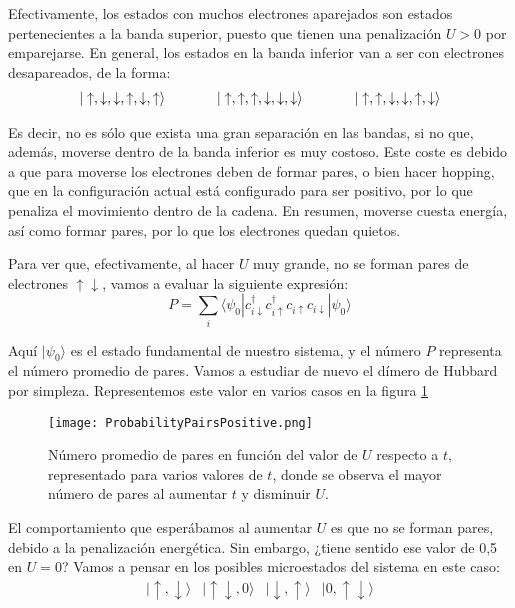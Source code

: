 \documentclass[12pt,twoside]{article}
\begin{document}
Efectivamente, los estados con muchos electrones aparejados son estados pertenecientes a la banda superior, puesto que tienen una penalización $U>0$ por emparejarse. En general, los estados en la banda inferior van a ser con electrones desapareados, de la forma:
$$
\begin{array}{ccccc}
  |\uparrow, \downarrow, \downarrow, \uparrow, \downarrow, \uparrow\rangle & \hspace{0.05\linewidth} & |\uparrow, \uparrow, \uparrow, \downarrow, \downarrow, \downarrow\rangle & \hspace{0.05\linewidth} & |\uparrow, \uparrow, \downarrow, \downarrow, \uparrow, \downarrow\rangle
\end{array}
$$

Es decir, no es sólo que exista una gran separación en las bandas, si no que, además, moverse dentro de la banda inferior es muy costoso. Este coste es debido a que para moverse los electrones deben de formar pares, o bien hacer hopping, que en la configuración actual está configurado para ser positivo, por lo que penaliza el movimiento dentro de la cadena. En resumen, moverse cuesta energía, así como formar pares, por lo que los electrones quedan quietos.

Para ver que, efectivamente, al hacer $U$ muy grande, no se forman pares de electrones $\uparrow\downarrow$, vamos a evaluar la siguiente expresión:
\begin{equation}
  P = \sum_i\langle\psi_0|c_{i\downarrow}^{\dagger}c_{i\uparrow}^{\dagger}c_{i\uparrow}c_{i\downarrow}|\psi_0\rangle
\end{equation}

Aquí $|\psi_0\rangle$ es el estado fundamental de nuestro sistema, y el número $P$ representa el número promedio de pares. Vamos a estudiar de nuevo el dímero de Hubbard por simpleza. Representemos este valor en varios casos en la figura \ref{fig:probPairsPos}
\begin{figure}[h!]
  \begin{center}
    \texttt{[image: ProbabilityPairsPositive.png]}
  \end{center}
  \caption{Número promedio de pares en función del valor de $U$ respecto a $t$, representado para varios valores de $t$, donde se observa el mayor número de pares al aumentar $t$ y disminuir $U$.}
  \label{fig:probPairsPos}
\end{figure}

El comportamiento que esperábamos al aumentar $U$ es que no se forman pares, debido a la penalización energética. Sin embargo, ¿tiene sentido ese valor de 0,5 en $U = 0$? Vamos a pensar en los posibles microestados del sistema en este caso:
$$
\begin{array}{cccc}
  |\uparrow, \downarrow\rangle & |\uparrow\downarrow, 0\rangle & |\downarrow, \uparrow\rangle & |0, \uparrow\downarrow\rangle
\end{array}
$$ 
\end{document}
